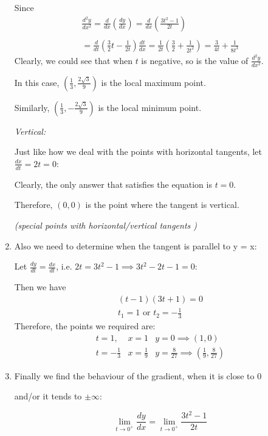 \documentclass[12pt]{report}
\begin{document}
\begin{enumerate}
    Since 
    $$
    \begin{array}{l}
        \frac{d^2y}{dx^2} = \frac{d}{dx}(\frac{dy}{dx}) = \frac{d}{dx}(\frac{3t^2 - 1}{2t})\\\\
        =\frac{d}{dt}(\frac{3}{2}t - \frac{1}{2t})\frac{dt}{dx}
        = \frac{1}{2t}(\frac{3}{2} + \frac{1}{2t^2}) 
        = \frac{3}{4t} + \frac{1}{8t^3}
    \end{array}
    $$
    Clearly, we could see that when $t$ is negative, so is the value of $\frac{d^2y}{dx^2}$. 
    
    In this case, 
    $(\frac{1}{3}, \frac{2\sqrt{3}}{9})$ is the local maximum point.

    Similarly,
    $(\frac{1}{3}, -\frac{2\sqrt{3}}{9})$ is the local minimum point.

    \emph{Vertical:} 
    
    Just like how we deal with the points with horizontal tangents, 
    let $\frac{dx}{dt} = 2t = 0$:

    Clearly, the only answer that satisfies the equation is $t = 0$.

    Therefore, $(0, 0)$ is the point where the tangent is vertical.

    \emph{(special points with horizontal/vertical tangents \checkmark)}
    \item Also we need to determine when the tangent is parallel to y = x:
    
    Let $\frac{dy}{dt} = \frac{dx}{dt}$, i.e. $2t = 3t^2 - 1 \implies 3t^2 - 2t - 1 = 0$:

    Then we have $$
    \begin{array}{ll}
        (t - 1)(3t + 1) = 0\\
        t_1 = 1 \text{ or } t_2 = -\frac{1}{3}
    \end{array}
    $$Therefore, the points we required are:$$
    \begin{array}{lll}
        t = 1,  & x = 1 & y = 0 \implies (1, 0) \\
        t = -\frac{1}{3} & x = \frac{1}{9} & y = \frac{8}{27} \implies (\frac{1}{9}, \frac{8}{27})
    \end{array}
    $$
    \item Finally we find the behaviour of the gradient, when it is close to $0$ 
    
    and/or it tends to $\pm \infty$:

    $$
    \lim_{t \to 0^+} \frac{dy}{dx} = \lim_{t \to 0^+} \frac{3t^2 - 1}{2t}
    $$


\end{enumerate}
\end{document}
